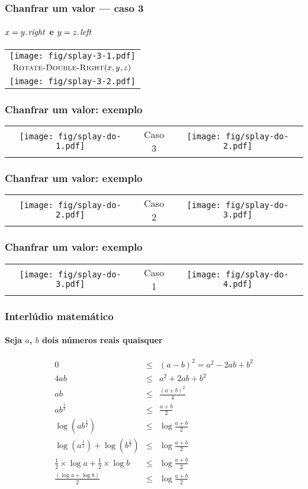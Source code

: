 \documentclass{beamer}
\begin{document}
\begin{frame}
\frametitle{Chanfrar um valor --- caso 3}
\framesubtitle{$x = \attrib{y}{right}$ e $y = \attrib{z}{left}$}

\begin{tabular}{c}
\texttt{[image: fig/splay-3-1.pdf]} \\
$\textnormal{\scshape Rotate-Double-Right}(x, y, z)$ \\
\texttt{[image: fig/splay-3-2.pdf]}
\end{tabular}

\end{frame}

\begin{frame}
\frametitle{Chanfrar um valor: exemplo}

\begin{tabular}[t]{ccc}
\texttt{[image: fig/splay-do-1.pdf]} &
Caso 3 &
\texttt{[image: fig/splay-do-2.pdf]}
\end{tabular}

\end{frame}

\begin{frame}
\frametitle{Chanfrar um valor: exemplo}

\begin{tabular}[t]{ccc}
\texttt{[image: fig/splay-do-2.pdf]} &
Caso 2 &
\texttt{[image: fig/splay-do-3.pdf]}
\end{tabular}

\end{frame}

\begin{frame}
\frametitle{Chanfrar um valor: exemplo}

\begin{tabular}[t]{ccc}
\texttt{[image: fig/splay-do-3.pdf]} &
Caso 1 &
\texttt{[image: fig/splay-do-4.pdf]}
\end{tabular}

\end{frame}

\begin{frame}
\frametitle{Interlúdio matemático}
\framesubtitle{Seja $a$, $b$ dois números reais quaisquer}

\begin{eqnarray*}
0 & \le & (a-b)^2 = a^2-2ab+b^2\\
4ab & \le & a^2+2ab+b^2 \\
ab & \le & \frac{(a+b)^2}{4}\\
ab^{\frac{1}{2}} & \le & \frac{a+b}{2} \\
\log (ab^{\frac{1}{2}}) & \le & \log\frac{a+b}{2} \\
\log (a^{\frac{1}{2}}) + \log(b^{\frac{1}{2}}) & \le & \log\frac{a+b}{2} \\
\frac{1}{2}\times\log a + \frac{1}{2}\times\log b & \le & \log\frac{a+b}{2} \\
\frac{(\log a + \log b)}{2} & \le & \log\frac{a+b}{2}
\end{eqnarray*}

\end{frame}
\end{document}
